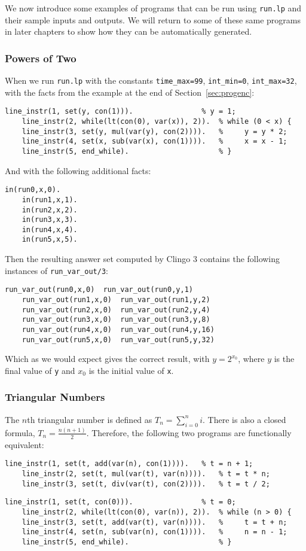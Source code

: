 \documentclass[a4paper,twoside,notitlepage]{report}
\begin{document}
We now introduce some examples of programs that can be run using 
\verb|run.lp| and their sample inputs and outputs. We will return to some 
of these same programs in later chapters to show how they can be 
automatically generated.

\subsubsection{Powers of Two}
When we run \verb|run.lp| with the constants \verb|time_max=99|, 
\verb|int_min=0|, \verb|int_max=32|, with the facts from the example at 
the end of Section~\ref{sec:progenc}:
\begin{Verbatim}[samepage=true]
    line_instr(1, set(y, con(1))).                % y = 1;
    line_instr(2, while(lt(con(0), var(x)), 2)).  % while (0 < x) {
    line_instr(3, set(y, mul(var(y), con(2)))).   %     y = y * 2;
    line_instr(4, set(x, sub(var(x), con(1)))).   %     x = x - 1;
    line_instr(5, end_while).                     % }
\end{Verbatim}
And with the following additional facts:
\begin{Verbatim}[samepage=true]
    in(run0,x,0).
    in(run1,x,1).
    in(run2,x,2).
    in(run3,x,3).
    in(run4,x,4).
    in(run5,x,5).
\end{Verbatim}
Then the resulting answer set computed by Clingo 3 contains the following 
instances of \verb|run_var_out/3|:
\begin{Verbatim}[samepage=true]
    run_var_out(run0,x,0)  run_var_out(run0,y,1)
    run_var_out(run1,x,0)  run_var_out(run1,y,2)
    run_var_out(run2,x,0)  run_var_out(run2,y,4)
    run_var_out(run3,x,0)  run_var_out(run3,y,8)
    run_var_out(run4,x,0)  run_var_out(run4,y,16) 
    run_var_out(run5,x,0)  run_var_out(run5,y,32)
\end{Verbatim}
Which as we would expect gives the correct result, with $y = 2^{x_0}$, 
where $y$ is the final value of \verb|y| and $x_0$ is the initial value of 
\verb|x|.

\subsubsection{Triangular Numbers}
The $n$th triangular number is defined as $T_n=\sum_{i=0}^n i$. There is 
also a closed formula, $T_n=\tfrac{n(n+1)}2$. Therefore, the following two 
programs are functionally equivalent:
\begin{Verbatim}[samepage=true]
    line_instr(1, set(t, add(var(n), con(1)))).   % t = n + 1;
    line_instr(2, set(t, mul(var(t), var(n)))).   % t = t * n;
    line_instr(3, set(t, div(var(t), con(2)))).   % t = t / 2;
\end{Verbatim}
\begin{Verbatim}[samepage=true]
    line_instr(1, set(t, con(0))).                % t = 0;
    line_instr(2, while(lt(con(0), var(n)), 2)).  % while (n > 0) {
    line_instr(3, set(t, add(var(t), var(n)))).   %     t = t + n;
    line_instr(4, set(n, sub(var(n), con(1)))).   %     n = n - 1;
    line_instr(5, end_while).                     % }
\end{Verbatim}
\end{document}
